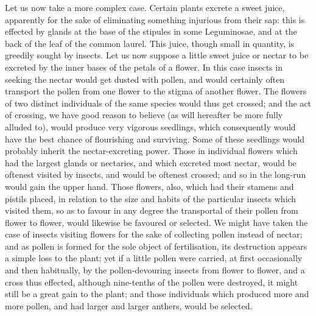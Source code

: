 \indent Let us now take a more complex case. Certain plants excrete a sweet juice, apparently for the sake of eliminating something injurious from their sap: this is effected by glands at the base of the stipules in some Leguminosae, and at the back of the leaf of the common laurel. This juice, though small in quantity, is greedily sought by insects. Let us now suppose a little sweet juice or nectar to be excreted by the inner bases of the petals of a flower. In this case insects in seeking the nectar would get dusted with pollen, and would certainly often transport the pollen from one flower to the stigma of another flower.  The flowers of two distinct individuals of the same species would thus get crossed; and the act of crossing, we have good reason to believe (as will hereafter be more fully alluded to), would produce very vigorous seedlings, which consequently would have the best chance of flourishing and surviving. Some of these seedlings would probably inherit the nectar-excreting power. Those in individual flowers which had the largest glands or nectaries, and which excreted most nectar, would be oftenest visited by insects, and would be oftenest crossed; and so in the long-run would gain the upper hand.  Those flowers, also, which had their stamens and pistils placed, in relation to the size and habits of the particular insects which visited them, so as to favour in any degree the transportal of their pollen from flower to flower, would likewise be favoured or selected.  We might have taken the case of insects visiting flowers for the sake of collecting pollen instead of nectar; and as pollen is formed for the sole object of fertilisation, its destruction appears a simple loss to the plant; yet if a little pollen were carried, at first occasionally and then habitually, by the pollen-devouring insects from flower to flower, and a cross thus effected, although nine-tenths of the pollen were destroyed, it might still be a great gain to the plant; and those individuals which produced more and more pollen, and had larger and larger anthers, would be selected. \\
